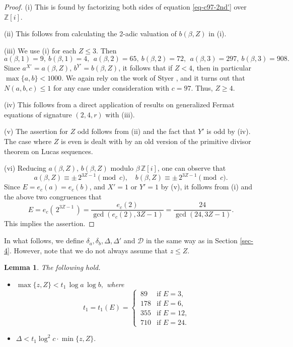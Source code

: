 \documentclass[11pt]{amsart}
\newtheorem{lem}{Lemma}[section]
\numberwithin{equation}{section}
\begin{document}
\begin{proof}
(i) This is found by factorizing both sides of equation \eqref{eq-c97-2nd'} over $\mathbb Z[i]$.
\par
(ii) This follows from calculating the 2-adic valuation of $b(\beta,Z)$ in (i).
\par
(iii) We use (i) for each $Z \le 3$. 
Then
\[
a(\beta,1)=9, \ b(\beta,1)=4, \ \ 
a(\beta,2)=65, \ b(\beta,2)=72, \ \ 
a(\beta,3)=297, \ b(\beta,3)=908.
\] 
Since $a^{X'}=a(\beta,Z),\,b^{Y'}=b(\beta,Z)$, it follows that if $Z<4$, then in particular $\max\{a,b\}<1000$.
We again rely on the work of Styer \cite{St}, and it turns out that $N(a,b,c) \le 1$ for any case under consideration with $c=97$.
Thus, $Z \ge 4$.
\par
(iv) This follows from a direct application of results on generalized Fermat equations of signature $(2,4,r)$ with (iii).
\par
(v) The assertion for $Z$ odd follows from (ii) and the fact that $Y'$ is odd by (iv).
The case where $Z$ is even is dealt with by an old version of the primitive divisor theorem on Lucas sequences.
\par
(vi) Reducing $a(\beta,Z),\,b(\beta,Z)$ modulo $\beta\,\mathbb Z[i]$, one can observe that 
\[
a(\beta,Z) \equiv \pm\,2^{3Z-1} \pmod{c}, \quad 
b(\beta,Z) \equiv \pm\,2^{3Z-1} \pmod{c}.
\]
Since $E=e_c(a)=e_c(b)$, and $X'=1$ or $Y'=1$ by (v), it follows from (i) and the above two congruences that
\[
E=e_{c}(\,2^{3Z-1}\,)=\frac{e_{c}(2)}{\gcd(e_c(2),3Z-1)}=\frac{24}{\gcd(24,3Z-1)}.%
\]
This implies the assertion. %
\end{proof}

In what follows, we define $\delta_a,\delta_b,\Delta, \Delta'$ and $\mathcal D$ in the same way as in Section \ref{sec-4}.
However, note that we do not always assume that $z \le Z$.

\begin{lem}\label{lem-c97-Eeven-Deltabound}
The following hold.
\begin{itemize}
\item[\rm (i)]
$\max\{z,Z\} < t_1 \, \log a \, \log b,$ where 
\[ t_1=t_1(E)=\begin{cases}
\,89 & \text{if $E=3,$}\\
\,178 & \text{if $E=6,$}\\
\,355 & \text{if $E=12,$}\\
\,710 & \text{if $E=24.$}
\end{cases}\]
\item[\rm (ii)]
$\Delta < t_1 \log^2 c \cdot \min\{z,Z\}.$
\end{itemize}
\end{lem}
\end{document}
